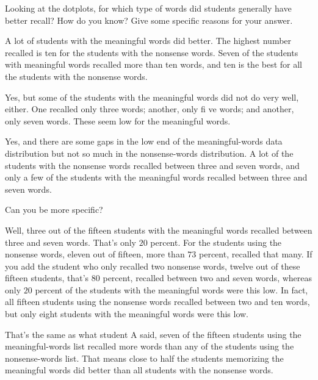 {    \begin{scriptlist}
      \item [Teacher:] Looking at the dotplots, for which type of words did students generally have better recall? How do you know? Give some specific reasons for your answer.

      \item [Student A:] A lot of students with the meaningful words did better. The highest number recalled is ten for the students with the nonsense words. Seven of the students with meaningful words recalled more than ten words, and ten is the best for all the students with the nonsense words.

      \item [Student B:] Yes, but some of the students with the meaningful words did not do very well, either. One recalled only three words; another, only fi ve words; and another, only seven words. These seem low for the meaningful words.

      \item [Student C:] Yes, and there are some gaps in the low end of the meaningful-words data distribution but not so much in the nonsense-words distribution. A lot of the students with the nonsense words recalled between three and seven words, and only a few of the students with the meaningful words recalled between three and seven words.

      \item [Teacher:] Can you be more specific?\vspace{\baselineskip}

      \item [Student C:] Well, three out of the fifteen students with the meaningful words recalled between three and seven words. That's only $20$ percent. For the students using the nonsense words, eleven out of fifteen, more than $73$ percent, recalled that many. If you add the student who only recalled two nonsense words, twelve out of these fifteen students, that's $80$ percent, recalled between two and seven words, whereas only $20$ percent of the students with the meaningful words were this low. In fact, all fifteen students using the nonsense words recalled between two and ten words, but only eight students with the meaningful words were this low.

      \item [Teacher:] That's the same as what student A said, seven of the fifteen students using the meaningful-words list recalled more words than any of the students using the nonsense-words list. That means close to half the students memorizing the meaningful words did better than all students with the nonsense words.


\end{scriptlist}}
